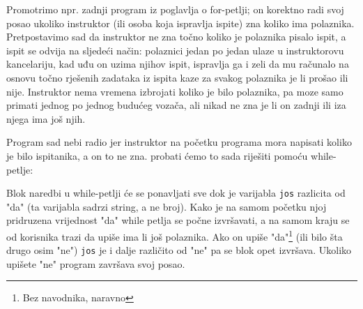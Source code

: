 Promotrimo npr. zadnji program iz poglavlja o for-petlji; on korektno radi svoj posao
ukoliko instruktor (ili osoba koja ispravlja ispite) zna koliko ima polaznika.
Pretpostavimo sad da instruktor ne zna točno koliko je polaznika pisalo ispit, a
ispit se odvija na sljedeći način: polaznici jedan po jedan ulaze u
instruktorovu kancelariju, kad uđu on uzima njihov ispit, ispravlja ga i
zeli da mu računalo na osnovu točno rješenih zadataka iz ispita
kaze za svakog polaznika je li prošao ili nije. Instruktor nema vremena
izbrojati koliko je bilo polaznika, pa moze samo primati jednog po jednog
budućeg vozača, ali nikad ne zna je li on zadnji ili iza njega ima još
njih.

Program sad nebi radio jer instruktor na početku programa mora napisati koliko
je bilo ispitanika, a on to ne zna. probati ćemo to sada riješiti
pomoću while-petlje:


Blok naredbi u while-petlji će se ponavljati sve dok je varijabla \verb"jos"
razlicita od "da" (ta varijabla sadrzi string, a ne broj). Kako je na samom
početku njoj pridruzena vrijednost "da" while petlja se počne
izvršavati, a na samom kraju se od korisnika trazi da upiše ima li
još polaznika. Ako on upiše "da"\footnote{Bez navodnika,
naravno} (ili bilo šta drugo osim "ne") \verb"jos"
je i dalje različito od "ne" pa se blok opet izvršava. Ukoliko upišete
"ne" program završava svoj posao.

